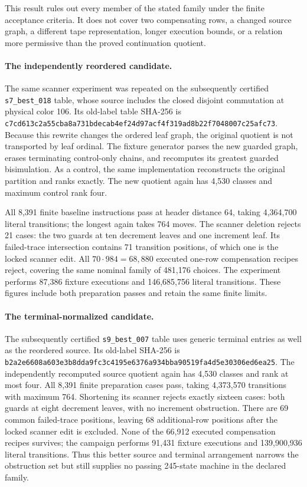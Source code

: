 This result rules out every member of the stated family under the finite
acceptance criteria. It does not cover two compensating rows, a changed
source graph, a different tape representation, longer execution bounds,
or a relation more permissive than the proved continuation quotient.

\paragraph{The independently reordered candidate.}
The same scanner experiment was repeated on the subsequently certified
\texttt{s7\_best\_018} table, whose source includes the closed disjoint
commutation at physical color 106. Its old-label table SHA-256 is
\nolinkurl{c7cd613c2a55cba8a731bdecab4ef24d97acf4f319ad8b22f7048007c25afc73}.
Because this rewrite changes the ordered leaf graph, the original quotient
is not transported by leaf ordinal. The fixture generator parses the new
guarded graph, erases terminating control-only chains, and recomputes its
greatest guarded bisimulation. As a control, the same implementation
reconstructs the original partition and ranks exactly. The new quotient
again has 4,530 classes and maximum control rank four.

All 8,391 finite baseline instructions pass at header distance 64, taking
4,364,700 literal transitions; the longest again takes 764 moves. The
scanner deletion rejects 21 cases: the two guards at ten decrement leaves
and one increment leaf. Its failed-trace intersection contains 71
transition positions, of which one is the locked scanner edit. All
$70\cdot984=68,880$ executed one-row compensation recipes reject, covering
the same nominal family of 481,176 choices. The experiment performs
87,386 fixture executions and 146,685,756 literal transitions. These
figures include both preparation passes and retain the same finite limits.

\paragraph{The terminal-normalized candidate.}
The subsequently certified \texttt{s9\_best\_007} table uses generic
terminal entries as well as the reordered source. Its old-label SHA-256 is
\nolinkurl{b2a2e6608a603e3b8dda9fc3c4195e6376a934bba90519fa4d5e30306ed6ea25}.
The independently recomputed source quotient again has 4,530 classes and
rank at most four. All 8,391 finite preparation cases pass, taking
4,373,570 transitions with maximum 764. Shortening its scanner rejects
exactly sixteen cases: both guards at eight decrement leaves, with no
increment obstruction. There are 69 common failed-trace positions, leaving
68 additional-row positions after the locked scanner edit is excluded.
None of the 66,912 executed compensation recipes survives; the campaign
performs 91,431 fixture executions and 139,900,936 literal transitions.
Thus this better source and terminal arrangement narrows the obstruction
set but still supplies no passing 245-state machine in the declared family.

